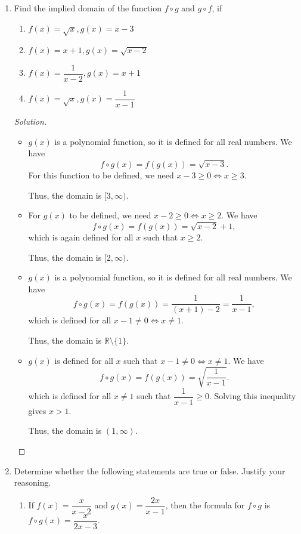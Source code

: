 \documentclass[12pt]{article}
\newenvironment{solution}{\begin{proof}[Solution]}{\end{proof}}
\begin{document}
\begin{enumerate}
		\item Find the implied domain of the function $f\circ g$ and $g\circ f$, if
		\begin{enumerate}
			\item $f(x)=\sqrt{x}, g(x)=x-3$
			\item $f(x)=x+1, g(x)=\sqrt{x-2}$
			\item $f(x)=\dfrac{1}{x-2}, g(x)=x+1$
			\item $f(x)=\sqrt{x},g(x)=\dfrac{1}{x-1}$
		\end{enumerate}
		
		\begin{solution}
			\begin{itemize}
				\item[(a)] $g(x)$ is a polynomial function, so it is defined for all real numbers. We have
				$$f\circ g(x)=f(g(x))=\sqrt{x-3}.$$
				For this function to be defined, we need $x-3\geq0\iff x\geq 3$.
				
				Thus, the domain is $[3,\infty)$.
				\item[(b)] For $g(x)$ to be defined, we need $x-2\geq 0 \iff x\geq 2$. We have 
				$$f\circ g(x)=f(g(x))=\sqrt{x-2}+1,$$
				which is again defined for all $x$ such that $x\geq 2$. 
				
				Thus, the domain is $[2,\infty).$
				\item[(c)] $g(x)$ is a polynomial function, so it is defined for all real numbers. We have 
				$$f\circ g(x)
				=f(g(x))
				=\dfrac{1}{(x+1)-2}
				=\dfrac{1}{x-1},$$
				which is defined for all $x-1\neq 0 \iff x\neq 1$.
				
				Thus, the domain is $\mathbb{R}\setminus\{1\}$.
				\item[(d)] $g(x)$ is defined for all $x$ such that $x-1\neq0 \iff x\neq 1$. We have
				$$f\circ g(x)
				=f(g(x))
				=\sqrt{\frac{1}{x-1}}.$$
				which is defined for all $x\neq 1$ such that $\dfrac{1}{x-1}\geq 0$. Solving this inequality gives $x>1$.
				
				Thus, the domain is $(1,\infty).$
			\end{itemize}
		\end{solution}
		
		\item Determine whether the following statements are true or false. Justify your reasoning.
		
		\begin{enumerate}
				
			\item If $f(x)=\dfrac{x}{x-2}$ and $g(x)=\dfrac{2x}{x-1}$, then the formula for $f\circ g$ is  $f\circ g(x)=\dfrac{x}{2x-3}$.
	

\end{enumerate}
\end{enumerate}
\end{document}
